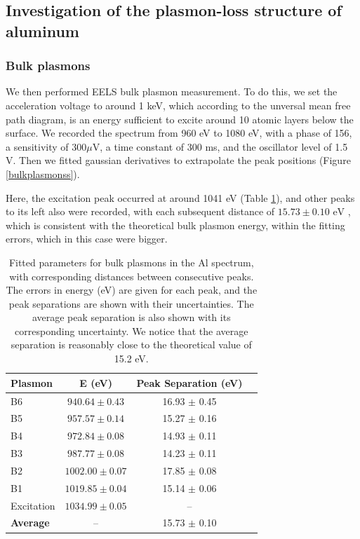 \documentclass[12pt]{article}
\begin{document}
\subsection{Investigation of the plasmon-loss structure of aluminum}
\subsubsection{Bulk plasmons}
We then performed EELS bulk plasmon measurement. To do this, we set the acceleration voltage to around 1 keV, which according to the unversal mean free path diagram, is an energy sufficient to excite around 10 atomic layers below the surface. We recorded the spectrum from 960 eV to 1080 eV, with a phase of 156\degree, a sensitivity of $300 \mu $V, a time constant of 300 ms, and the oscillator level of 1.5 V.
Then we fitted gaussian derivatives to extrapolate the peak positions (Figure \ref{bulkplasmonss}).

Here, the excitation peak occurred at around 1041 eV (Table \ref{tab:mu_distances1}), and other peaks to its left also were recorded, with each subsequent distance of $15.73 \pm  0.10 \text{ eV}$ \cite{palmberg1991handbook}, which is consistent with the theoretical bulk plasmon energy, within the fitting errors, which in this case were bigger. %


\begin{table}[h!]
    \centering
    \begin{tabular}{lccc}
        \toprule
        \textbf{Plasmon} & \textbf{E (eV)} & \textbf{Peak Separation (eV)} \\
        \midrule
        B6          & $940.64 \pm 0.43$  & 16.93 $\pm$ 0.45 \\
        B5          & $957.57 \pm 0.14$  & 15.27 $\pm$ 0.16 \\
        B4          & $972.84 \pm 0.08$  & 14.93 $\pm$ 0.11 \\
        B3          & $987.77 \pm 0.08$  & 14.23 $\pm$ 0.11 \\
        B2          & $1002.00 \pm 0.07$ & 17.85 $\pm$ 0.08 \\
        B1          & $1019.85 \pm 0.04$ & 15.14 $\pm$ 0.06 \\
        Excitation  & $1034.99 \pm 0.05$ & -- \\
        \midrule
        \textbf{Average}  & --  & 15.73 $\pm$ 0.10 \\
        \bottomrule
    \end{tabular}
    \caption{Fitted parameters for bulk plasmons in the Al spectrum, with corresponding distances between consecutive peaks. The errors in energy (eV) are given for each peak, and the peak separations are shown with their uncertainties. The average peak separation is also shown with its corresponding uncertainty. We notice that the average separation is reasonably close to the theoretical value of 15.2 eV.}
    \label{tab:mu_distances1}
\end{table}
\end{document}
